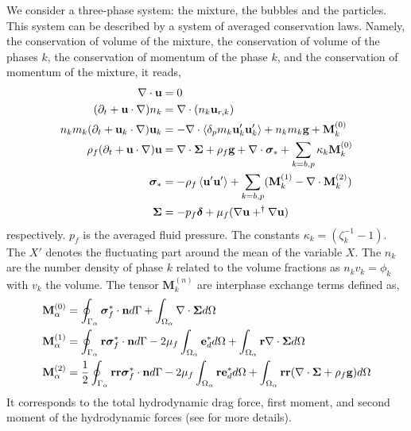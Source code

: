 We consider a three-phase system: the mixture, the bubbles and the particles.
This system can be described by a system of averaged conservation laws.
Namely, the conservation of volume of the mixture, the conservation of volume of the phases $k$, the conservation of momentum of the phase $k$, and the conservation of momentum of the mixture, it reads, 
\begin{align}
    \div \textbf{u} &= 0\\
     (\pddt + \textbf{u} \cdot \grad) n_k &= \div (n_k \textbf{u}_{r,k})\\
    n_k m_k (\pddt + \textbf{u}_k \cdot \grad) \textbf{u}_k &= 
    - \div \pavg{m_k\textbf{u}_k'\textbf{u}_k'}+n_k m_k \textbf{g}
    +\textbf{M}_k^{(0)}
    \label{eq:u_k}
    \\
    \rho_f (\pddt + \textbf{u} \cdot \grad)\textbf{u}
    &= 
    \div\bm\Sigma
    + \rho_f \textbf{g}
    + \div \bm\sigma_*
    +\sum_{k=b,p} \kappa_k  \textbf{M}_k^{(0)}
    \label{eq:u_dt}\\
    \bm\sigma_* &= 
    - \rho_f \avg{\textbf{u}'\textbf{u}'}
    + \sum_{k=b,p} (\textbf{M}_k^{(1)}
    -\div \textbf{M}_k^{(2)})\\
    \bm\Sigma &= 
    - p_f \bm\delta + \mu_f (\grad \textbf{u}+ ^\dagger \grad \textbf{u})
\end{align}
respectively. 
$p_f$ is the averaged fluid pressure. 
The constants $\kappa_k = (\zeta_k^{-1}- 1)$. 
The $X'$ denotes the fluctuating part around the mean of the variable $X$. 
The $n_k$ are the number density of phase $k$ related to the volume fractions as $n_k v_k = \phi_k$ with $v_k$ the volume. 
The tensor $\textbf{M}_k^{(n)}$ are interphase exchange terms defined as, 
\begin{align}
    \textbf{M}_\alpha^{(0)} &=
    \oint_{\Gamma_{\alpha}} \bm{\sigma}_f^* \cdot \textbf{n} d\Gamma
   +\int_{\Omega_{\alpha}} \mathbf{\nabla}\cdot \bm\Sigma d\Omega
   \\
   \textbf{M}_\alpha^{(1)} &=
   \oint_{\Gamma_{\alpha}} \textbf{r}\bm{\sigma}_f^* \cdot \textbf{n} d\Gamma
   -2\mu_f \int_{\Omega_{\alpha}} \textbf{e}_d^* d\Omega
   +\int_{\Omega_{\alpha}} \textbf{r}\mathbf{\nabla}\cdot \bm\Sigma d\Omega
   \\
   \textbf{M}_\alpha^{(2)} &=
   \frac{1}{2}\oint_{\Gamma_{\alpha}} \textbf{rr}\bm{\sigma}_f^* \cdot \textbf{n} d\Gamma
   -2\mu_f \int_{\Omega_{\alpha}} \textbf{re}_d^* d\Omega
   +\int_{\Omega_{\alpha}} \textbf{rr}(\mathbf{\nabla}\cdot \bm\Sigma+ \rho_f\textbf{g}) d\Omega
\end{align}
It corresponds to the total hydrodynamic drag force, first moment, and second moment of the hydrodynamic forces (see \citet{fintzi2024averaged} for more details). 

